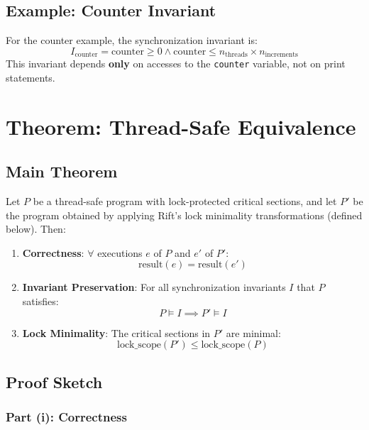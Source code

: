 \documentclass[11pt]{article}
\begin{document}
\subsection{Example: Counter Invariant}

For the counter example, the synchronization invariant is:
\[
I_{\text{counter}} = \text{counter} \geq 0 \land \text{counter} \leq n_{\text{threads}} \times n_{\text{increments}}
\]
This invariant depends \textbf{only} on accesses to the \texttt{counter} variable, not on print statements.

\section{Theorem: Thread-Safe Equivalence}

\subsection{Main Theorem}

\begin{theorem} \label{thm:main}
Let $P$ be a thread-safe program with lock-protected critical sections, and let $P'$ be the program obtained by applying Rift's lock minimality transformations (defined below). Then:

\begin{enumerate}
    \item[(i)] \textbf{Correctness}: $\forall$ executions $e$ of $P$ and $e'$ of $P'$:
    \[
    \text{result}(e) = \text{result}(e')
    \]
    
    \item[(ii)] \textbf{Invariant Preservation}: For all synchronization invariants $I$ that $P$ satisfies:
    \[
    P \models I \implies P' \models I
    \]
    
    \item[(iii)] \textbf{Lock Minimality}: The critical sections in $P'$ are minimal:
    \[
    \text{lock\_scope}(P') \leq \text{lock\_scope}(P)
    \]
\end{enumerate}
\end{theorem}

\subsection{Proof Sketch}

\subsubsection{Part (i): Correctness}
\end{document}
